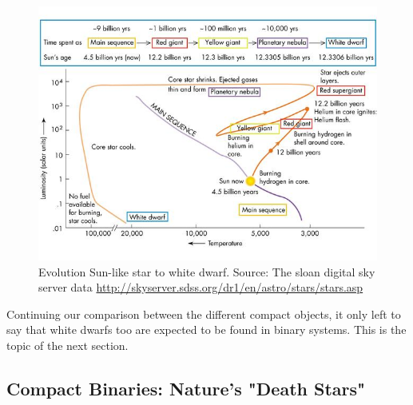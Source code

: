 \begin{figure}[]
        \centering
\includegraphics[scale=2]{assets/images/starevol.jpg}
\caption{Evolution Sun-like star to white dwarf. Source: The sloan digital sky server data \protect\url{http://skyserver.sdss.org/dr1/en/astro/stars/stars.asp}}
\label{fig:hrwd}
\end{figure}

Continuing our comparison between the different compact objects, it only left to say that white dwarfs too are expected to be found in binary systems. This is the topic of the next section. 

\subsection[Compact Binaries]{Compact Binaries: Nature's "Death Stars"}\label{sec:cb}

